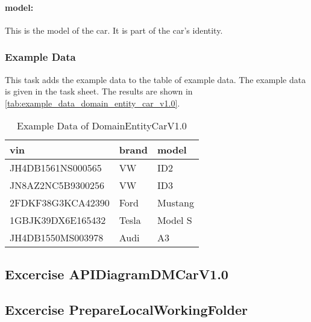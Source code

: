 \paragraph*{model:}
This is the model of the car.
It is part of the car's identity.

\subsubsection*{Example Data}
This task adds the example data to the table of example data.
The example data is given in the task sheet.
The results are shown in \autoref{tab:example_data_domain_entity_car_v1.0}.
\begin{table}
    \centering
    \caption{Example Data of DomainEntityCarV1.0}
    \label{tab:example_data_domain_entity_car_v1.0}
    \begin{tabular}{|p{5cm}|p{2cm}|p{2cm}|}
        \hline
        vin & brand & model \\
        \hline
        JH4DB1561NS000565 & VW & ID2 \\
        JN8AZ2NC5B9300256 & VW & ID3 \\
        2FDKF38G3KCA42390 & Ford & Mustang \\
        1GBJK39DX6E165432 & Tesla & Model S \\
        JH4DB1550MS003978 & Audi & A3 \\
        \hline
    \end{tabular}
\end{table}

\subsection{Excercise APIDiagramDMCarV1.0}
\label{subsec:api_diagram_dm_car_v1.0}


\subsection{Excercise PrepareLocalWorkingFolder}
\label{subsec:prepare_local_working_folder}